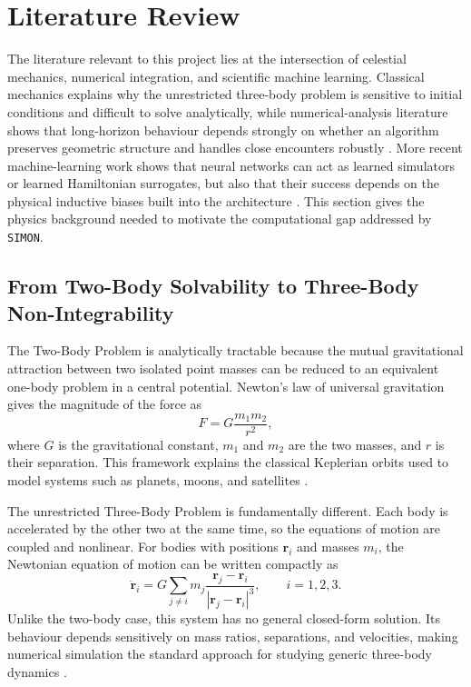 \documentclass[12pt]{article}
\begin{document}
\section{Literature Review}
\label{sec:lit_review}

The literature relevant to this project lies at the intersection of celestial mechanics,
numerical integration, and scientific machine learning. Classical mechanics explains why
the unrestricted three-body problem is sensitive to initial conditions and difficult to solve
analytically, while numerical-analysis literature shows that long-horizon behaviour depends
strongly on whether an algorithm preserves geometric structure and handles close encounters
robustly \cite{hairer2006geometric,Rein_2015,Rein_2014,boekholt2015reliability}. More recent
machine-learning work shows that neural networks can act as learned simulators or learned
Hamiltonian surrogates, but also that their success depends on the physical inductive biases
built into the architecture \cite{chen2018neuralode,battaglia2016interaction,greydanus2019hamiltonian,gruver2022deconstructing,horn2025generalized}. This section gives the physics background needed to motivate the computational gap addressed by \texttt{SIMON}.

\subsection{From Two-Body Solvability to Three-Body Non-Integrability}

The Two-Body Problem is analytically tractable because the mutual gravitational attraction
between two isolated point masses can be reduced to an equivalent one-body problem in a
central potential. Newton's law of universal gravitation gives the magnitude of the force as
\begin{equation}
F = G\frac{m_1m_2}{r^2},
\end{equation}
where $G$ is the gravitational constant, $m_1$ and $m_2$ are the two masses, and $r$ is their
separation. This framework explains the classical Keplerian orbits used to model systems
such as planets, moons, and satellites \cite{murray1999solar}.

The unrestricted Three-Body Problem is fundamentally different. Each body is accelerated
by the other two at the same time, so the equations of motion are coupled and nonlinear.
For bodies with positions $\mathbf r_i$ and masses $m_i$, the Newtonian equation of motion
can be written compactly as
\begin{equation}
\ddot{\mathbf r}_i =
G\sum_{j\ne i} m_j
\frac{\mathbf r_j-\mathbf r_i}{|\mathbf r_j-\mathbf r_i|^3},
\qquad i=1,2,3.
\end{equation}
Unlike the two-body case, this system has no general closed-form solution. Its behaviour
depends sensitively on mass ratios, separations, and velocities, making numerical simulation
the standard approach for studying generic three-body dynamics \cite{murray1999solar}.
\end{document}
